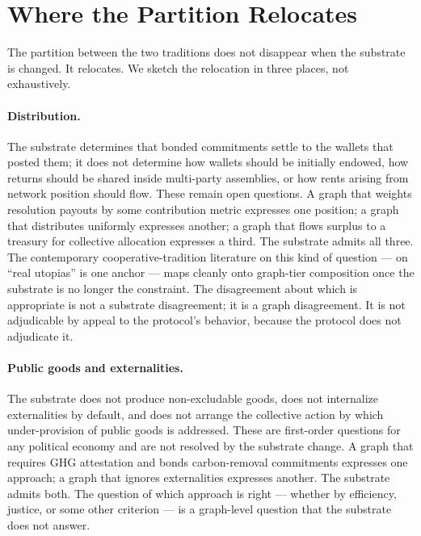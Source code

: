 \documentclass[11pt,a4paper]{article}
\theoremstyle{remark}
\begin{document}
\section{Where the Partition Relocates}
\label{sec:relocation}

The partition between the two traditions does not disappear when
the substrate is changed. It relocates. We sketch the relocation
in three places, not exhaustively.

\paragraph{Distribution.}
The substrate determines that bonded commitments settle to the
wallets that posted them; it does not determine how wallets
should be initially endowed, how returns should be shared inside
multi-party assemblies, or how rents arising from network
position should flow. These remain open questions. A graph that
weights resolution payouts by some contribution metric expresses
one position; a graph that distributes uniformly expresses
another; a graph that flows surplus to a treasury for collective
allocation expresses a third. The substrate admits all three.
The contemporary cooperative-tradition literature on this kind
of question --- \citet{wright2010envisioning} on ``real
utopias'' is one anchor --- maps cleanly onto graph-tier
composition once the substrate is no longer the constraint.
The disagreement about which is appropriate is not a substrate
disagreement; it is a graph disagreement. It is not adjudicable
by appeal to the protocol's behavior, because the protocol does
not adjudicate it.

\paragraph{Public goods and externalities.}
The substrate does not produce non-excludable goods, does not
internalize externalities by default, and does not arrange the
collective action by which under-provision of public goods is
addressed. These are first-order questions for any political
economy and are not resolved by the substrate change. A graph
that requires GHG attestation and bonds carbon-removal
commitments expresses one approach; a graph that ignores
externalities expresses another. The substrate admits both. The
question of which approach is right --- whether by efficiency,
justice, or some other criterion --- is a graph-level question
that the substrate does not answer.
\end{document}
